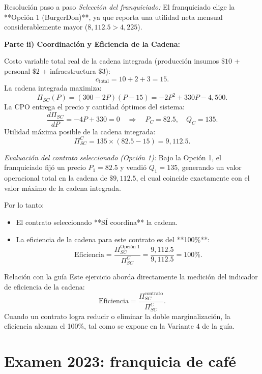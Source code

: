 \documentclass[11pt,a4paper]{article}
\begin{document}
\begin{pauta}{Resolución paso a paso}
\textit{Selección del franquiciado:}
El franquiciado elige la **Opción 1 (BurgerDon)**, ya que reporta una utilidad neta mensual considerablemente mayor (\(8{,}112.5 > 4{,}225\)).

\textbf{Parte ii) Coordinación y Eficiencia de la Cadena:}

Costo variable total real de la cadena integrada (producción insumos \(\$10\) + personal \(\$2\) + infraestructura \(\$3\)):
\[
c_{\text{total}} = 10 + 2 + 3 = 15.
\]
La cadena integrada maximiza:
\[
\Pi_{SC}(P) = (300 - 2P)(P - 15) = -2P^2 + 330P - 4{,}500.
\]
La CPO entrega el precio y cantidad óptimos del sistema:
\[
\frac{d\Pi_{SC}}{dP} = -4P + 330 = 0 \quad\Rightarrow\quad P_C = 82.5, \quad Q_C = 135.
\]
Utilidad máxima posible de la cadena integrada:
\[
\Pi_{SC}^C = 135 \times (82.5 - 15) = \boxed{9{,}112.5.}
\]

\textit{Evaluación del contrato seleccionado (Opción 1):}
Bajo la Opción 1, el franquiciado fijó un precio \(P_1 = 82.5\) y vendió \(Q_1 = 135\), generando un valor operacional total en la cadena de \(\$9{,}112.5\), el cual coincide exactamente con el valor máximo de la cadena integrada.

Por lo tanto:
\begin{itemize}[itemsep=2pt]
    \item El contrato seleccionado **SÍ coordina** la cadena.
    \item La eficiencia de la cadena para este contrato es del **100\%**:
    \[
    \text{Eficiencia} = \frac{\Pi_{SC}^{\text{Opción 1}}}{\Pi_{SC}^C} = \frac{9{,}112.5}{9{,}112.5} = 100\%.
    \]
\end{itemize}
\end{pauta}

\begin{analisis}{Relación con la guía}
Este ejercicio aborda directamente la medición del indicador de eficiencia de la cadena:
\[
\text{Eficiencia} = \frac{\Pi_{SC}^{\text{contrato}}}{\Pi_{SC}^C}.
\]
Cuando un contrato logra reducir o eliminar la doble marginalización, la eficiencia alcanza el 100\%, tal como se expone en la Variante 4 de la guía.
\end{analisis}

\section{Examen 2023: franquicia de café}
\end{document}
